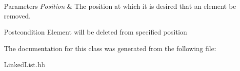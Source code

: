 \begin{DoxyParams}{Parameters}
{\em Position} & The position at which it is desired that an element be removed. \\
\hline
\end{DoxyParams}
\begin{DoxyPostcond}{Postcondition}
Element will be deleted from specified position 
\end{DoxyPostcond}


The documentation for this class was generated from the following file\-:\begin{DoxyCompactItemize}
\item 
Linked\-List.\-hh\end{DoxyCompactItemize}
